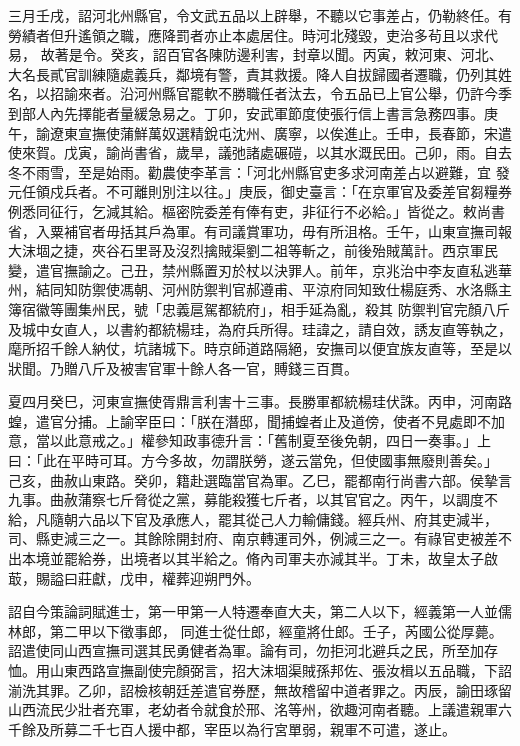 \begin{pinyinscope}
 三月壬戌，詔河北州縣官，令文武五品以上辟舉，不聽以它事差占，仍勒終任。有勞績者但升遙領之職，應降罰者亦止本處居住。時河北殘毀，吏治多茍且以求代易，
 故著是令。癸亥，詔百官各陳防邊利害，封章以聞。丙寅，敕河東、河北、大名長貳官訓練隨處義兵，鄰境有警，責其救援。降人自拔歸國者遷職，仍列其姓名，以招諭來者。沿河州縣官罷軟不勝職任者汰去，令五品已上官公舉，仍許今季到部人內先擇能者量緩急易之。丁卯，安武軍節度使張行信上書言急務四事。庚午，諭遼東宣撫使蒲鮮萬奴選精銳屯沈州、廣寧，以俟進止。壬申，長春節，宋遣使來賀。戊寅，諭尚書省，歲旱，議弛諸處碾磑，以其水溉民田。己卯，雨。自去冬不雨雪，至是始雨。勸農使李革言：「河北州縣官吏多求河南差占以避難，宜
 發元任領戍兵者。不可離則別注以往。」庚辰，御史臺言：「在京軍官及委差官芻糧券例悉同征行，乞減其給。樞密院委差有俸有吏，非征行不必給。」皆從之。敕尚書省，入粟補官者毋括其戶為軍。有司議賞軍功，毋有所沮格。壬午，山東宣撫司報大沫堌之捷，夾谷石里哥及沒烈擒賊渠劉二祖等斬之，前後殆賊萬計。西京軍民變，遣官撫諭之。己丑，禁州縣置刃於杖以決罪人。前年，京兆治中李友直私逃華州，結同知防禦使馮朝、河州防禦判官郝遵甫、平涼府同知致仕楊庭秀、水洛縣主簿宿徽等團集州民，號「忠義扈駕都統府」，相手延為亂，殺其
 防禦判官完顏八斤及城中女直人，以書約都統楊珪，為府兵所得。珪諱之，請自效，誘友直等執之，麾所招千餘人納仗，坑諸城下。時京師道路隔絕，安撫司以便宜族友直等，至是以狀聞。乃贈八斤及被害官軍十餘人各一官，賻錢三百貫。



 夏四月癸巳，河東宣撫使胥鼎言利害十三事。長勝軍都統楊珪伏誅。丙申，河南路蝗，遣官分捕。上諭宰臣曰：「朕在潛邸，聞捕蝗者止及道傍，使者不見處即不加意，當以此意戒之。」權參知政事德升言：「舊制夏至後免朝，四日一奏事。」上曰：「此在平時可耳。方今多故，勿謂朕勞，遂云當免，但使國事無廢則善矣。」
 己亥，曲赦山東路。癸卯，籍赴選臨當官為軍。乙巳，罷都南行尚書六部。侯摯言九事。曲赦蒲察七斤脅從之黨，募能殺獲七斤者，以其官官之。丙午，以調度不給，凡隨朝六品以下官及承應人，罷其從己人力輸傭錢。經兵州、府其吏減半，司、縣吏減三之一。其餘除開封府、南京轉運司外，例減三之一。有祿官吏被差不出本境並罷給券，出境者以其半給之。脩內司軍夫亦減其半。丁未，故皇太子啟菆，賜謚曰莊獻，戊申，權葬迎朔門外。



 詔自今策論詞賦進士，第一甲第一人特遷奉直大夫，第二人以下，經義第一人並儒林郎，第二甲以下徵事郎，
 同進士從仕郎，經童將仕郎。壬子，芮國公從厚薨。詔遣使同山西宣撫司選其民勇健者為軍。論有司，勿拒河北避兵之民，所至加存恤。用山東西路宣撫副使完顏弼言，招大沫堌渠賊孫邦佐、張汝楫以五品職，下詔湔洗其罪。乙卯，詔檢核朝廷差遣官券歷，無故稽留中道者罪之。丙辰，諭田琢留山西流民少壯者充軍，老幼者令就食於邢、洺等州，欲趣河南者聽。上議遣親軍六千餘及所募二千七百人援中都，宰臣以為行宮單弱，親軍不可遣，遂止。




\end{pinyinscope}
